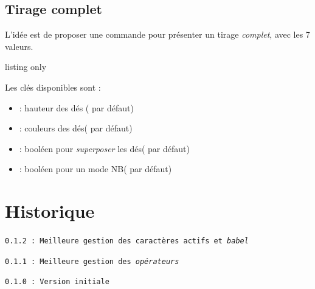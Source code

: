 \documentclass[11pt,a4paper]{ltxdoc}
\begin{document}
\begin{DemoCode}{}
\end{DemoCode}

\begin{DemoCode}{}
\end{DemoCode}

\subsection{Tirage complet}

L'idée est de proposer une commande pour présenter un tirage \textit{complet}, avec les 7 valeurs.

\begin{DemoCode}{listing only}
\end{DemoCode}

Les \textsf{clés} disponibles sont :

\begin{itemize}
	\item {} : hauteur des dés \hfill(\ShowCode{1.5cm} par défaut)
	\item {} : couleurs des dés\hfill( par défaut)
	\item {} : booléen pour \textit{superposer} les dés\hfill( par défaut)
	\item {} : booléen pour un mode NB\hfill( par défaut)
\end{itemize}

\begin{DemoCode}{}
\end{DemoCode}

\begin{DemoCode}{}
\end{DemoCode}

\pagebreak

\section{Historique}

\texttt{0.1.2 : Meilleure gestion des caractères actifs et \textit{babel}}

\texttt{0.1.1 : Meilleure gestion des \textit{opérateurs}}

\texttt{0.1.0 : Version initiale}
%
%
\end{document}
